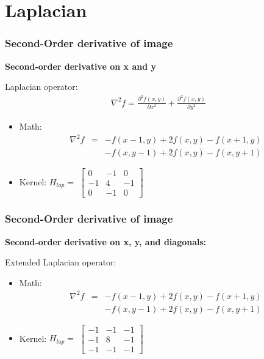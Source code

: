 \documentclass[english,11pt,table,handout]{beamer}
\begin{document}
\section{Laplacian}
\frame
{
	\frametitle{Second-Order derivative of image}
	
	\alert{\textbf{Second-order derivative on x and y}}
	
	Laplacian operator: 
	\begin{align}
		\nonumber
		\nabla^{2}f = \frac{\partial^{2} f(x,y)}{\partial x^2}  + \frac{\partial^{2} f(x,y)}{\partial y^2} 
	\end{align}
	
	\begin{itemize}
		\item Math: 
		\begin{align}
		\nonumber
		\nabla^{2}f & = &-f(x-1, y) + 2f(x,y) - f(x+1,y) \\
		\nonumber
		&&-f(x, y-1) + 2f(x,y) - f(x,y+1)
		\end{align}
		
		
		\item Kernel:  $H_{lap} = $ $\left[ 
		\begin{array}{rrr} 
		0 & -1 & 0 \\
		-1 & 4 & -1\\
		0 & -1 & 0
		\end{array}\right] $
		
	\end{itemize}
	
	
}
\frame
{
	\frametitle{Second-Order derivative of image}
	
	\alert{\textbf{Second-order derivative on x, y, and diagonals:}}
	
	Extended Laplacian operator: 
	
	\begin{itemize}
		\item Math: 
		\begin{align}
		\nonumber
		\nabla^{2}f & = &-f(x-1, y) + 2f(x,y) - f(x+1,y) \\
		\nonumber
		&&-f(x, y-1) + 2f(x,y) - f(x,y+1)
		\end{align}
		
		
		\item Kernel:  $H_{lap} = $ $\left[ 
		\begin{array}{rrr} 
		-1 & -1 & -1 \\
		-1 & 8 & -1\\
		-1 & -1 & -1
		\end{array}\right] $
		
	\end{itemize}
}
\end{document}

